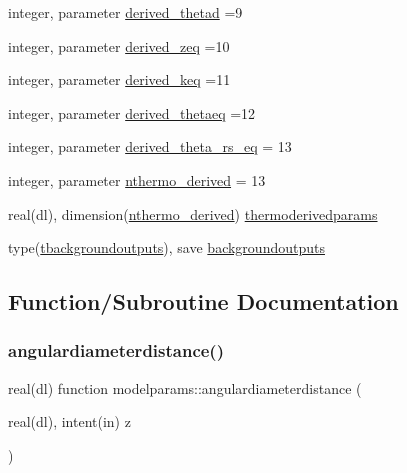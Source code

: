 \begin{DoxyCompactItemize}
\item 
integer, parameter \mbox{\hyperlink{namespacemodelparams_aa8c5e706aaaef69a8fa8e0230f1242d3}{derived\+\_\+thetad}} =9
\item 
integer, parameter \mbox{\hyperlink{namespacemodelparams_a47dbe62349dd11d37540763b6dc4e630}{derived\+\_\+zeq}} =10
\item 
integer, parameter \mbox{\hyperlink{namespacemodelparams_a9158352b05bd5c94db9c9f39b728b8af}{derived\+\_\+keq}} =11
\item 
integer, parameter \mbox{\hyperlink{namespacemodelparams_aa10d4b47c739162ede20adf21b82dcb7}{derived\+\_\+thetaeq}} =12
\item 
integer, parameter \mbox{\hyperlink{namespacemodelparams_acba5f72246541278ec6edcb88ebc2197}{derived\+\_\+theta\+\_\+rs\+\_\+eq}} = 13
\item 
integer, parameter \mbox{\hyperlink{namespacemodelparams_a3763c4095d154f01def46dfce33faffd}{nthermo\+\_\+derived}} = 13
\item 
real(dl), dimension(\mbox{\hyperlink{namespacemodelparams_a3763c4095d154f01def46dfce33faffd}{nthermo\+\_\+derived}}) \mbox{\hyperlink{namespacemodelparams_a81091ac7021dd731decc138dc9886329}{thermoderivedparams}}
\item 
type(\mbox{\hyperlink{structmodelparams_1_1tbackgroundoutputs}{tbackgroundoutputs}}), save \mbox{\hyperlink{namespacemodelparams_ad4f70e5f61b1f44ff823eb7f25e96b45}{backgroundoutputs}}
\end{DoxyCompactItemize}


\subsection{Function/\+Subroutine Documentation}
\mbox{\label{namespacemodelparams_a63c764e54b9b02649d00f8071cb9297f}} 
\subsubsection{\texorpdfstring{angulardiameterdistance()}{angulardiameterdistance()}}
{\footnotesize\ttfamily real(dl) function modelparams\+::angulardiameterdistance (\begin{DoxyParamCaption}\item[{real(dl), intent(in)}]{z }\end{DoxyParamCaption})}



